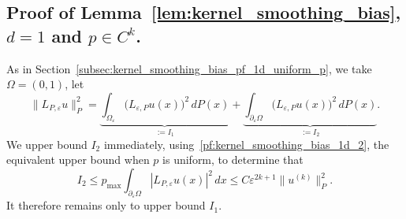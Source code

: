 \documentclass{article}
\newcommand{\1}{\mathbf{1}}
\theoremstyle{definition}
\theoremstyle{remark}
\begin{document}
\subsection{Proof of Lemma~\ref{lem:kernel_smoothing_bias}, $d = 1$ and $p \in C^k$.}
\label{subsec:kernel_smoothing_bias_pf_1d_smooth_p}
As in Section~\ref{subsec:kernel_smoothing_bias_pf_1d_uniform_p}, we take $\Omega = (0,1)$, let
\begin{equation*}
\|L_{P,\varepsilon}u\|_{P}^2 = \underbrace{\int_{\Omega_{\varepsilon}} \bigl(L_{\varepsilon,P}u(x)\bigr)^2 \,dP(x)}_{:=I_1} + \underbrace{\int_{\partial_{\varepsilon}\Omega} \bigl(L_{\varepsilon,P}u(x)\bigr)^2 \,dP(x)}_{:=I_2}.
\end{equation*}
We upper bound $I_2$ immediately, using~\eqref{pf:kernel_smoothing_bias_1d_2}, the equivalent upper bound when $p$ is uniform, to determine that
\begin{equation*}
I_2 \leq p_{\max}\int_{\partial_{\varepsilon}\Omega} |L_{P,\varepsilon}u(x)|^2 \,dx \leq C\varepsilon^{2k + 1}\|u^{(k)}\|_P^2.
\end{equation*}
It therefore remains only to upper bound $I_1$. 
\end{document}
